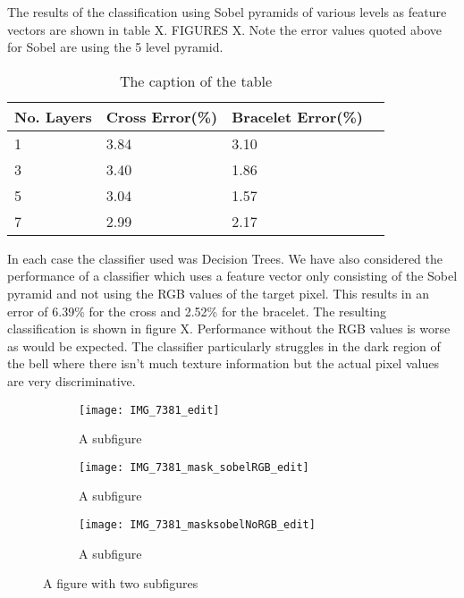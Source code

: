 \documentclass[12pt]{IIBproject}
\begin{document}
The results of the classification using Sobel pyramids of various levels as feature vectors are shown in table X. FIGURES X. Note the error values quoted above for Sobel are using the 5 level pyramid.
\begin{table}
\begin{center}
    \begin{tabular}{ | l | l | l | p{5cm} |}
    \hline
    No. Layers & Cross Error(\%) & Bracelet Error(\%) \\ \hline
    1 & 3.84 & 3.10 \\ \hline
    3 & 3.40 & 1.86 \\ \hline
    5 & 3.04 & 1.57 \\
    \hline
    7 & 2.99 & 2.17 \\
    \hline
    
    \end{tabular}
    \caption{The caption of the table}\label{table:somename}
\end{center}
\end{table}
In each case the classifier used was Decision Trees. We have also considered the performance of a classifier which uses a feature vector only consisting of the Sobel pyramid and not using the RGB values of the target pixel. This results in an error of 6.39\% for the cross and 2.52\% for the bracelet. The resulting classification is shown in figure X. Performance without the RGB values is worse as would be expected. The classifier particularly struggles in the dark region of the bell where there isn't much texture information but the actual pixel values are very discriminative.
\begin{figure}[H]
\centering
\begin{subfigure}{.5\textwidth}
  \centering
  \texttt{[image: IMG\_7381\_edit]}
  \caption{A subfigure}
  \label{fig:sub2}
\end{subfigure}
\begin{subfigure}{.5\textwidth}
  \centering
  \texttt{[image: IMG\_7381\_mask\_sobelRGB\_edit]}
  \caption{A subfigure}
  \label{fig:sub1}
\end{subfigure}%
\begin{subfigure}{.5\textwidth}
  \centering
  \texttt{[image: IMG\_7381\_masksobelNoRGB\_edit]}
  \caption{A subfigure}
  \label{fig:sub2}
\end{subfigure}

\caption{A figure with two subfigures}
\label{fig:test}
\end{figure}
\end{document}
